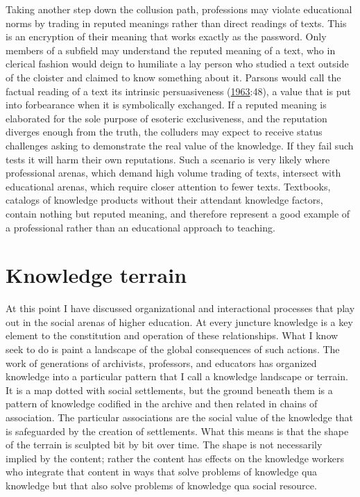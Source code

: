 \documentclass[]{book}
\theoremstyle{definition}
\theoremstyle{definition}
\theoremstyle{definition}
\theoremstyle{remark}
\begin{document}
Taking another step down the collusion path, professions may violate
educational norms by trading in reputed meanings rather than direct
readings of texts. This is an encryption of their meaning that works
exactly as the password. Only members of a subfield may understand the
reputed meaning of a text, who in clerical fashion would deign to
humiliate a lay person who studied a text outside of the cloister and
claimed to know something about it. Parsons would call the factual
reading of a text its intrinsic persuasiveness
(\protect\hyperlink{ref-Parsons1963Concept}{1963}:48), a value that is
put into forbearance when it is symbolically exchanged. If a reputed
meaning is elaborated for the sole purpose of esoteric exclusiveness,
and the reputation diverges enough from the truth, the colluders may
expect to receive status challenges asking to demonstrate the real value
of the knowledge. If they fail such tests it will harm their own
reputations. Such a scenario is very likely where professional arenas,
which demand high volume trading of texts, intersect with educational
arenas, which require closer attention to fewer texts. Textbooks,
catalogs of knowledge products without their attendant knowledge
factors, contain nothing but reputed meaning, and therefore represent a
good example of a professional rather than an educational approach to
teaching.

\hypertarget{knowledge-terrain}{%
\section{Knowledge terrain}\label{knowledge-terrain}}

At this point I have discussed organizational and interactional
processes that play out in the social arenas of higher education. At
every juncture knowledge is a key element to the constitution and
operation of these relationships. What I know seek to do is paint a
landscape of the global consequences of such actions. The work of
generations of archivists, professors, and educators has organized
knowledge into a particular pattern that I call a knowledge landscape or
terrain. It is a map dotted with social settlements, but the ground
beneath them is a pattern of knowledge codified in the archive and then
related in chains of association. The particular associations are the
social value of the knowledge that is safeguarded by the creation of
settlements. What this means is that the shape of the terrain is
sculpted bit by bit over time. The shape is not necessarily implied by
the content; rather the content has effects on the knowledge workers who
integrate that content in ways that solve problems of knowledge qua
knowledge but that also solve problems of knowledge qua social resource.
\end{document}
